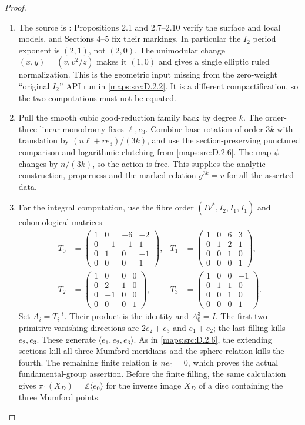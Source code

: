 \begin{proof}
\begin{enumerate}[label=\arabic*.,leftmargin=*]
\item The source is \cite{manWang26}: Propositions 2.1 and
2.7--2.10 verify the surface and local models, and
Sections 4--5 fix their markings. In particular the $I_2$ period
exponent is $(2,1)$, not $(2,0)$. The unimodular change
$(x,y)=(v,v^2/z)$ makes it $(1,0)$ and gives a single
elliptic ruled normalization. This is the geometric input
missing from the zero-weight ``original $I_2$'' API run in \ref{maps:src:D.2.2}.
It is a different compactification, so the two computations
must not be equated.

\item Pull the smooth cubic good-reduction family back by degree $k$.
The order-three linear monodromy fixes $\ell,e_3$.
Combine base rotation of order $3k$ with translation by
$(n\ell+r e_3)/(3k)$, and use the section-preserving punctured
comparison and logarithmic clutching from \ref{maps:src:D.2.6}. The map $\psi$
changes by $n/(3k)$, so the action is free. This supplies the
analytic construction, properness and the marked relation
$g^{3k}=v$ for all the asserted data.

\item For the integral computation, use the fibre order
$(IV^*,I_2,I_1,I_1)$ and cohomological matrices
\[
 \begin{aligned}
 T_0&=\begin{pmatrix}1&0&-6&-2\\0&-1&-1&1\\0&1&0&-1\\0&0&0&1\end{pmatrix},
 &T_1&=\begin{pmatrix}1&0&6&3\\0&1&2&1\\0&0&1&0\\0&0&0&1\end{pmatrix},\\
 T_2&=\begin{pmatrix}1&0&0&0\\0&2&1&0\\0&-1&0&0\\0&0&0&1\end{pmatrix},
 &T_3&=\begin{pmatrix}1&0&0&-1\\0&1&1&0\\0&0&1&0\\0&0&0&1\end{pmatrix}.
 \end{aligned}
\]
Set $A_i=T_i^{-t}$. Their product is the identity and
$A_0^3=I$. The first two primitive vanishing directions are
$2e_2+e_3$ and $e_1+e_2$; the last filling kills $e_2,e_3$.
These generate $\langle e_1,e_2,e_3\rangle$. As in \ref{maps:src:D.2.6},
the extending sections kill all three Mumford meridians and
the sphere relation kills the fourth. The remaining finite
relation is $ne_0=0$, which proves the actual fundamental-group
assertion. Before the finite filling, the same calculation
gives $\pi_1(X_D)=\mathbb Z\langle e_0\rangle$ for the
inverse image $X_D$ of a disc containing the three Mumford points.


\end{enumerate}
\end{proof}
